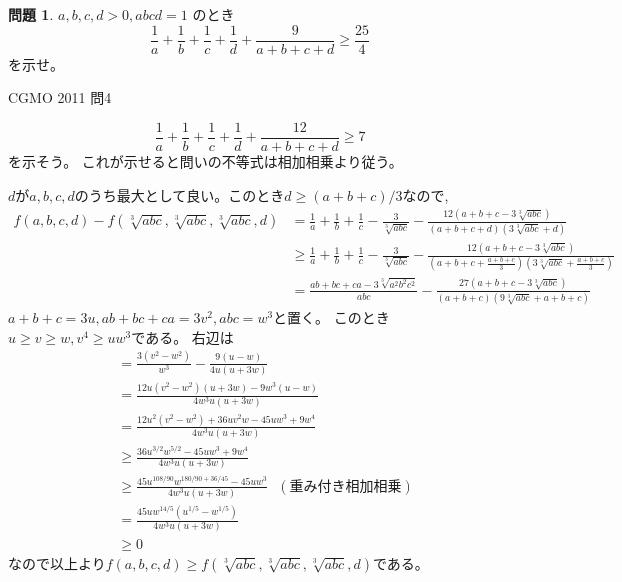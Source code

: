 \documentclass[uplatex, a5paper]{jsarticle}
\makeatletter
\theoremstyle{definition}
\newtheorem{prob}{問題}
\renewenvironment{proof}[1][\proofname]{
  \pushQED{\qed}%
  \normalfont \topsep6\p@\@plus6\p@\relax
  \trivlist
  \item[\hskip\labelsep
    #1\@addpunct{\textbf{.}}]\ignorespaces
}{%
  \popQED\endtrivlist\@endpefalse
}
\providecommand{\proofname}{証明}
\def\qed{\hfill $\Box$}
\makeatother
\begin{document}
\newpage

\begin{prob}
  \(a , b , c , d > 0 , abcd=1 \)
  のとき
  \[
  \frac{1}{a} + \frac{1}{b} + \frac{1}{c} + \frac{1}{d} + \frac{9}{a+b+c+d} \geq \frac{25}{4}
  \]
  を示せ。
  \begin{flushright}
    CGMO 2011 問4
  \end{flushright}
\end{prob}


\begin{proof}
  \[
  \frac{1}{a} + \frac{1}{b} + \frac{1}{c} + \frac{1}{d} + \frac{12}{a+b+c+d} \geq 7
  \]
  を示そう。
  これが示せると問いの不等式は相加相乗より従う。

  \(d\)が\(a,b,c,d\)のうち最大として良い。このとき\(d \geq (a+b+c)/3\)なので,
  \begin{align*}
    f(a,b,c,d) - f( \sqrt[3]{abc} , \sqrt[3]{abc} , \sqrt[3]{abc} , d )
    &= \frac{1}{a} + \frac{1}{b} + \frac{1}{c} - \frac{3}{ \sqrt[3]{abc} }
    - \frac{12 ( a+b+c -3\sqrt[3]{abc}) }{(a+b+c+d)(3\sqrt[3]{abc} + d) } \\
    &\geq \frac{1}{a} + \frac{1}{b} + \frac{1}{c} - \frac{3}{ \sqrt[3]{abc} }
    - \frac{12(a+b+c -3\sqrt[3]{abc}) }{\left( a+b+c+\frac{a+b+c}{3}\right)
    \left( 3\sqrt[3]{abc} + \frac{a+b+c}{3} \right) } \\
    &= \frac{ab+bc+ca - 3\sqrt[3]{a^2b^2c^2} }{abc}
    - \frac{27( a+b+c -3\sqrt[3]{abc}) }{(a+b+c)(9\sqrt[3]{abc}+a+b+c)}
  \end{align*}
  \(a+b+c=3u,ab+bc+ca=3v^2,abc=w^3\)と置く。
  このとき\(u\geq v \geq w , v^4\geq uw^3\)である。
  右辺は
  \begin{align*}
    &= \frac{3(v^2-w^2 )}{w^3} - \frac{9(u-w)}{4u \left( u+3w \right) } \\
    &= \frac{12u(v^2-w^2)(u+3w) -9w^3(u-w) }{4w^3u(u+3w) } \\
    &= \frac{12u^2(v^2 - w^2) + 36uv^2w - 45uw^3 +9w^4 }{4w^3u(u+3w) } \\
    &\geq \frac{36u^{3/2}w^{5/2} - 45uw^3 +9w^4 }{4w^3u(u+3w) } \\
    &\geq \frac{45u^{108/90}w^{180/90+36/45} - 45uw^3 }{4w^3u(u+3w) } \ \ \ (\mbox{重み付き相加相乗}) \\
    &= \frac{45uw^{14/5}\left( u^{1/5} - w^{1/5} \right) }{4w^3u(u+3w) } \\
    &\geq 0
  \end{align*}
  なので以上より\(f(a,b,c,d) \geq f( \sqrt[3]{abc} , \sqrt[3]{abc} , \sqrt[3]{abc} , d)\)である。


\end{proof}
\end{document}
